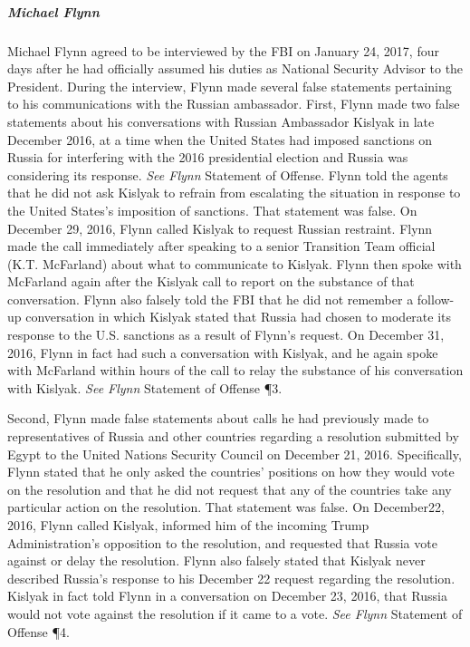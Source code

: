 \subparagraph{Michael Flynn}
Michael Flynn agreed to be interviewed by the FBI on January 24, 2017, four days after he had officially assumed his duties as National Security Advisor to the President. 
During the interview, Flynn made several false statements pertaining to his communications with the Russian ambassador. 
First, Flynn made two false statements about his conversations with Russian Ambassador Kislyak in late December 2016, at a time when the United States had imposed sanctions on Russia for interfering with the 2016 presidential election and Russia was considering its response. 
\textit{See Flynn} Statement of Offense. 
Flynn told the agents that he did not ask Kislyak to refrain from escalating the situation in response to the United States's imposition of sanctions. 
That statement was false. 
On December 29, 2016, Flynn called Kislyak to request Russian restraint. 
Flynn made the call immediately after speaking to a senior Transition Team official (K.T. McFarland) about what to communicate to Kislyak. 
Flynn then spoke with McFarland again after the Kislyak call to report on the substance of that conversation. 
Flynn also falsely told the FBI that he did not remember a follow-up conversation in which Kislyak stated that Russia had chosen to moderate its response to the U.S. sanctions as a result of Flynn's request. 
On December 31, 2016, Flynn in fact had such a conversation with Kislyak, and he again spoke with McFarland within hours of the call to relay the substance of his conversation with Kislyak. 
\textit{See Flynn} Statement of Offense \P 3.

Second, Flynn made false statements about calls he had previously made to representatives of Russia and other countries regarding a resolution submitted by Egypt to the United Nations Security Council on December 21, 2016. 
Specifically, Flynn stated that he only asked the countries' positions on how they would vote on the resolution and that he did not request that any of the countries take any particular action on the resolution. 
That statement was false. 
On December22, 2016, Flynn called Kislyak, informed him of the incoming Trump Administration's opposition to the resolution, and requested that Russia vote against or delay the resolution. 
Flynn also falsely stated that Kislyak never described Russia's response to his December 22 request regarding the resolution. 
Kislyak in fact told Flynn in a conversation on December 23, 2016, that Russia would not vote against the resolution if it came to a vote. 
\textit{See Flynn} Statement of Offense \P 4.

